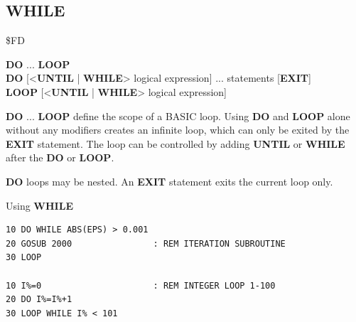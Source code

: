 \subsection{WHILE}
\begin{description}[leftmargin=2cm,style=nextline]
\item [Token:]    \$FD

\item [Format:]   {\bf DO} ... {\bf LOOP} \\
                  {\bf DO} [<{\bf UNTIL} | {\bf WHILE}> logical expression] ... statements [{\bf EXIT}] \\
                  {\bf LOOP} [<{\bf UNTIL} | {\bf WHILE}> logical expression]

\item [Usage:]    {\bf DO} ... {\bf LOOP} define the scope of a BASIC loop. Using {\bf DO} and {\bf LOOP} alone without any modifiers creates an infinite loop, which can only be exited by the {\bf EXIT} statement. The loop can be controlled by adding {\bf UNTIL} or {\bf WHILE} after the {\bf DO} or {\bf LOOP}.

\item [Remarks:]  {\bf DO} loops may be nested. An {\bf EXIT} statement exits the current loop only.

\item [Examples:] Using {\bf WHILE}

\begin{tcolorbox}[colback=black,coltext=white]
\verbatimfont{\codefont}
\begin{verbatim}
10 DO WHILE ABS(EPS) > 0.001
20 GOSUB 2000                : REM ITERATION SUBROUTINE
30 LOOP

10 I%=0                      : REM INTEGER LOOP 1-100
20 DO I%=I%+1
30 LOOP WHILE I% < 101
\end{verbatim}
\end{tcolorbox}
\end{description}


\newpage
